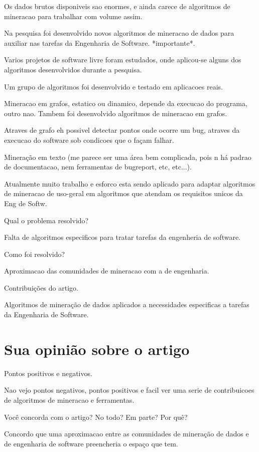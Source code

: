 \documentclass{article}
\begin{document}
Os dados brutos disponiveis sao enormes, e ainda carece de algoritmos de mineracao para trabalhar com volume assim.

Na pesquisa foi desenvolvido novos algoritmos de mineracao de dados para auxiliar nas tarefas da Engenharia de Software. *importante*.

Varios projetos de software livre foram estudados, onde aplicou-se alguns dos algoritmos desenvolvidos durante a pesquisa.

Um grupo de algoritmos foi desenvolvido e testado em aplicacoes reais.

Mineracao em grafos, estatico ou dinamico, depende da execucao do programa, outro nao. Tambem foi desenvolvido algoritmos de mineracao em grafos.

Atraves de grafo eh possivel detectar pontos onde ocorre um bug, atraves da  execucao do software sob condicoes que o façam falhar.

Mineração em texto (me parece ser uma área bem complicada, pois n há padrao de documentacao, nem ferramentas de bugreport, etc, etc...).

Atualmente muito trabalho e esforco esta sendo aplicado para adaptar algoritmos de mineracao de uso-geral em algoritmos que atendam os requisitos unicos da Eng de Softw.

Qual o problema resolvido? 

Falta de algoritmos especificos para tratar tarefas da engenheria de software.

Como foi resolvido? 

Aproximacao das comunidades de mineracao com a de engenharia.

Contribuições do artigo.

Algoritmos de mineração de dados aplicados a necessidades especificas a tarefas da Engenharia de Software.

\section{Sua opinião sobre o artigo}

Pontos positivos e negativos.

Nao vejo pontos negativos, pontos positivos e facil ver uma serie de contribuicoes de algoritmos de mineracao e ferramentas.

Você concorda com o artigo? No todo? Em parte? Por quê?

Concordo que uma aproximacao entre as comunidades de mineração de dados e de engenharia de software preencheria o espaço que tem.
\end{document}
